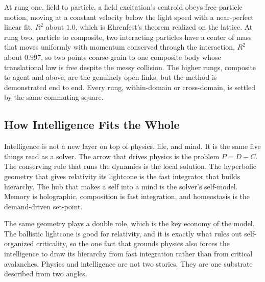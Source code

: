 At rung one, field to particle, a field excitation's centroid obeys free-particle motion, moving at a constant velocity below the light speed with a near-perfect linear fit, $R^{2}$ about $1.0$, which is Ehrenfest's theorem realized on the lattice. At rung two, particle to composite, two interacting particles have a center of mass that moves uniformly with momentum conserved through the interaction, $R^{2}$ about $0.997$, so two points coarse-grain to one composite body whose translational law is free despite the messy collision. The higher rungs, composite to agent and above, are the genuinely open links, but the method is demonstrated end to end. Every rung, within-domain or cross-domain, is settled by the same commuting square.

\subsection{How Intelligence Fits the Whole}

Intelligence is not a new layer on top of physics, life, and mind. It is the same five things read as a solver. The arrow that drives physics is the problem $P = D - C$. The conserving rule that runs the dynamics is the local solution. The hyperbolic geometry that gives relativity its lightcone is the fast integrator that builds hierarchy. The hub that makes a self into a mind is the solver's self-model. Memory is holographic, composition is fast integration, and homeostasis is the demand-driven set-point.

The same geometry plays a double role, which is the key economy of the model. The ballistic lightcone is good for relativity, and it is exactly what rules out self-organized criticality, so the one fact that grounds physics also forces the intelligence to draw its hierarchy from fast integration rather than from critical avalanches. Physics and intelligence are not two stories. They are one substrate described from two angles.
